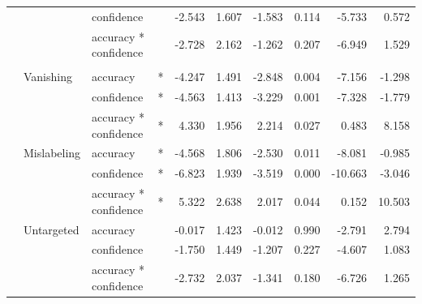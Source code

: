\begin{longtable}[t]{llllrrrrrr}
\cmidrule{3-10}\nopagebreak
\hspace{1em} &  & confidence &  & -2.543 & 1.607 & -1.583 & 0.114 & -5.733 & 0.572\\
\cmidrule{3-10}\nopagebreak
\hspace{1em} &  & accuracy * confidence &  & -2.728 & 2.162 & -1.262 & 0.207 & -6.949 & 1.529\\
\cmidrule{1-10}\pagebreak[0]
\addlinespace[0.3em]
\multicolumn{10}{l}{\textbf{Cascade R-CNN}}\\
\hspace{1em} & Vanishing & accuracy & * & -4.247 & 1.491 & -2.848 & 0.004 & -7.156 & -1.298\\
\cmidrule{3-10}\nopagebreak
\hspace{1em} &  & confidence & * & -4.563 & 1.413 & -3.229 & 0.001 & -7.328 & -1.779\\
\cmidrule{3-10}\nopagebreak
\hspace{1em} &  & accuracy * confidence & * & 4.330 & 1.956 & 2.214 & 0.027 & 0.483 & 8.158\\
\cmidrule{2-10}\nopagebreak
\hspace{1em} & Mislabeling & accuracy & * & -4.568 & 1.806 & -2.530 & 0.011 & -8.081 & -0.985\\
\cmidrule{3-10}\nopagebreak
\hspace{1em} &  & confidence & * & -6.823 & 1.939 & -3.519 & 0.000 & -10.663 & -3.046\\
\cmidrule{3-10}\nopagebreak
\hspace{1em} &  & accuracy * confidence & * & 5.322 & 2.638 & 2.017 & 0.044 & 0.152 & 10.503\\
\cmidrule{2-10}\nopagebreak
\hspace{1em} & Untargeted & accuracy &  & -0.017 & 1.423 & -0.012 & 0.990 & -2.791 & 2.794\\
\cmidrule{3-10}\nopagebreak
\hspace{1em} &  & confidence &  & -1.750 & 1.449 & -1.207 & 0.227 & -4.607 & 1.083\\
\cmidrule{3-10}\nopagebreak
\hspace{1em} &  & accuracy * confidence &  & -2.732 & 2.037 & -1.341 & 0.180 & -6.726 & 1.265\\
\bottomrule
\end{longtable}
\endgroup{}

